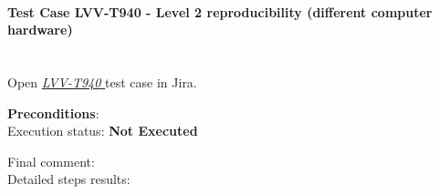 \documentclass[DM,lsstdraft,STR,toc]{lsstdoc}
\begin{document}
\paragraph{Test Case LVV-T940 - Level 2 reproducibility (different computer hardware)
 }\mbox{}\\

Open  \href{https://jira.lsstcorp.org/secure/Tests.jspa#/testCase/LVV-T940}{\textit{ LVV-T940 } }
test case in Jira.



\textbf{ Preconditions}:\\


Execution status: {\bf Not Executed }

Final comment:\\


Detailed steps results:
\end{document}
